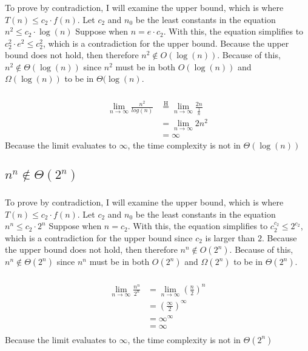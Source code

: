 \documentclass{article}
\begin{document}
        \subsubsection{}
            To prove by contradiction, I will examine the upper bound, which is where $T(n) \leq c_2 \cdot f(n)$. Let $c_2$ and $n_0$ be the least constants in the equation $n^2 \leq c_2 \cdot \log(n)$ Suppose when $n = e \cdot c_2$. With this, the equation simplifies to $c_2^2\cdot e^2 \leq c_2^2$, which is a contradiction for the upper bound. Because the upper bound does not hold, then therefore $n^2 \notin O(\log(n))$. Because of this, $n^2 \notin \Theta(\log(n))$ since $n^2$ must be in both $O(\log(n))$ and $\Omega(\log(n))$ to be in $\Theta(\log(n)$.
        \subsubsection{}
            \begin{align*}
                \lim_{n\to\infty} \frac{n^2}{log(n)}
                &\overset{\mathrm{H}}{=} \lim_{n\to\infty} \frac{2n}{\frac{1}{n}}\\
                &= \lim_{n\to\infty} 2n^2\\
                &= \infty\
            \end{align*}
            Because the limit evaluates to $\infty$, the time complexity is not in $\Theta(\log(n))$
    \subsection{$n^n \notin \Theta(2^n)$}
        \subsubsection{}
            To prove by contradiction, I will examine the upper bound, which is where $T(n) \leq c_2 \cdot f(n)$. Let $c_2$ and $n_0$ be the least constants in the equation $n^n \leq c_2 \cdot 2^n$ Suppose when $n = c_2$. With this, the equation simplifies to $c_2^{c_2} \leq 2^{c_2}$, which is a contradiction for the upper bound since $c_2$ is larger than $2$. Because the upper bound does not hold, then therefore $n^n \notin O(2^n)$. Because of this, $n^n \notin \Theta(2^n)$ since $n^n$ must be in both $O(2^n)$ and $\Omega(2^n)$ to be in $\Theta(2^n)$.
        \subsubsection{}
            \begin{align*}
                \lim_{n\to\infty} \frac{n^n}{2^n}
                &= \lim_{n\to\infty} (\frac{n}{2})^n\\
                &= (\frac{\infty}{2})^\infty\\
                &= \infty^\infty\\
                &= \infty\\
            \end{align*}
            Because the limit evaluates to $\infty$, the time complexity is not in $\Theta(2^n)$
\end{document}
